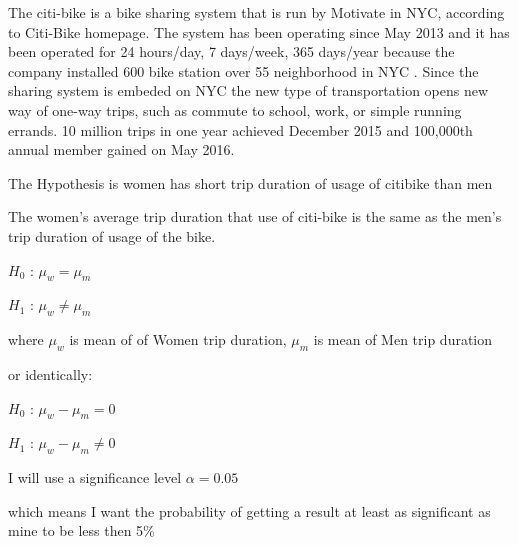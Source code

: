 The citi-bike is a bike sharing system that is run by Motivate in NYC, according to Citi-Bike homepage\cite{nyc}. The system has been operating since May 2013 and it has been operated for 24 hours/day, 7 days/week, 365 days/year because the company installed 600 bike station over 55 neighborhood in NYC \cite{nyc}. Since the sharing system is embeded on NYC the new type of transportation opens new way of one-way trips, such as commute to school, work, or simple running errands. 10 million trips in one year achieved December 2015 and 100,000th annual member gained on May 2016\cite{nyc}.

The Hypothesis is women has short trip duration of usage of citibike than men

The women's average trip duration that use of citi-bike is the same as the men's trip duration of usage of the bike.


$H_0$ : $\mu_w  = \mu_m $ 

$H_1$ : $\mu_w  \neq \mu_m $ 

where $\mu_w$ is mean of of Women trip duration, $\mu_m$ is mean of Men trip duration

or identically:

$H_0$ : $\mu_w - \mu_m   = 0 $

$H_1$ : $\mu_w  - \mu_m   \neq 0 $

 I will use a significance level  $\alpha=0.05$

which means I want the probability of getting a result at least as significant as mine to be less then 5\%




